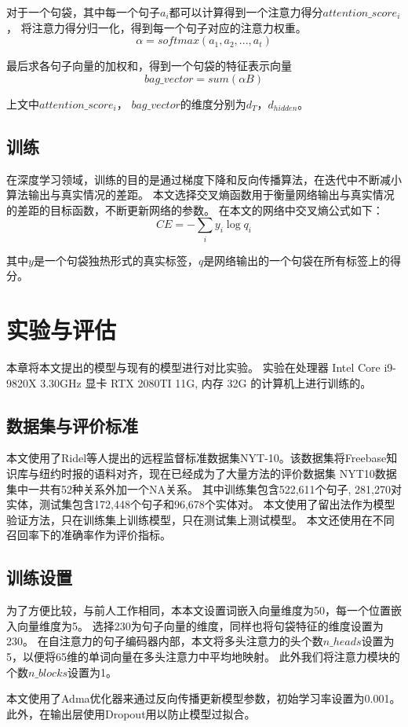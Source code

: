 \documentclass[UTF8]{csoarticle}
\begin{document}
对于一个句袋，其中每一个句子$a_i$都可以计算得到一个注意力得分$attention\_score_i$，
将注意力得分归一化，得到每一个句子对应的注意力权重。
\[\alpha = softmax({a_1,a_2,...,a_t})\]

最后求各句子向量的加权和，得到一个句袋的特征表示向量
\[bag\_vector = sum(\alpha  B)\]

上文中$attention\_score_i$， $bag\_vector$的维度分别为$d_T$，$d_{hidden}$。

\subsection{训练}
在深度学习领域，训练的目的是通过梯度下降和反向传播算法，在迭代中不断减小算法输出与真实情况的差距。
本文选择交叉熵函数用于衡量网络输出与真实情况的差距的目标函数，不断更新网络的参数。
在本文的网络中交叉熵公式如下：
\[ CE =-\sum _{i}y_i \log q_i\]

其中$y$是一个句袋独热形式的真实标签，$q$是网络输出的一个句袋在所有标签上的得分。
\section{实验与评估}
本章将本文提出的模型与现有的模型进行对比实验。
实验在处理器 Intel Core i9-9820X 3.30GHz 显卡 RTX 2080TI 11G, 内存 32G 的计算机上进行训练的。

\subsection{数据集与评价标准}
本文使用了Ridel\cite{bib2}等人提出的远程监督标准数据集NYT-10。该数据集将Freebase知识库与纽约时报的语料对齐，现在已经成为了大量方法的评价数据集
NYT10数据集中一共有52种关系外加一个NA关系。
其中训练集包含522,611个句子, 281,270对实体，测试集包含172,448个句子和96,678个实体对。
本文使用了留出法作为模型验证方法，只在训练集上训练模型，只在测试集上测试模型。
本文还使用在不同召回率下的准确率作为评价指标。

\subsection{训练设置}
为了方便比较，与前人工作\cite{bib3, bib4}相同，本本文设置词嵌入向量维度为50，每一个位置嵌入向量维度为5。
选择230为句子向量的维度，同样也将句袋特征的维度设置为230。
在自注意力的句子编码器内部，本文将多头注意力的头个数$n\_heads$设置为5，以便将65维的单词向量在多头注意力中平均地映射。
此外我们将注意力模块的个数$n\_blocks$设置为1。

本文使用了Adma优化器来通过反向传播更新模型参数，初始学习率设置为0.001。此外，在输出层使用Dropout用以防止模型过拟合。
\end{document}
